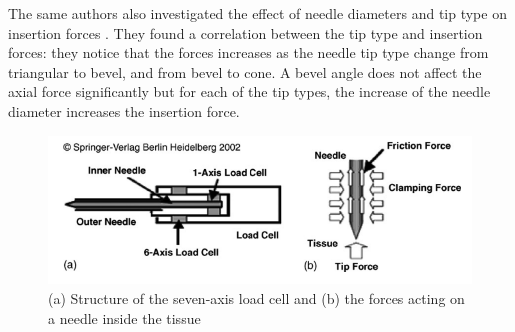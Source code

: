 The same authors also investigated the effect of needle diameters and tip type on insertion forces \cite{Okamura2004}.
They found a correlation between the tip type and insertion forces: they notice that the forces increases as the needle tip type change from triangular to bevel, and from bevel to cone.
A bevel angle does not affect the axial force significantly but for each of the tip types, the increase of the needle diameter increases the insertion force.
\begin{figure}
	\includegraphics[width=\textwidth]{images/Kataoka.png}
	\caption[The seven-axis load cell]{(a) Structure of the seven-axis load cell and (b) the forces acting on a needle inside the tissue \cite{Kataoka2002}}
	\label{fig:kataoka_load_cell}
\end{figure}

